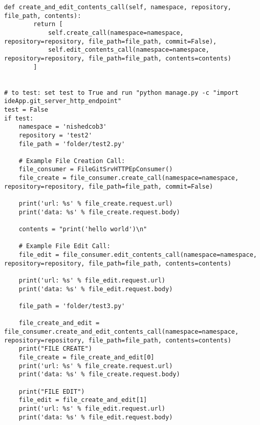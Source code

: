 \begin{lstlisting}[breaklines]
    def create_and_edit_contents_call(self, namespace, repository, file_path, contents):
        return [
            self.create_call(namespace=namespace, repository=repository, file_path=file_path, commit=False),
            self.edit_contents_call(namespace=namespace, repository=repository, file_path=file_path, contents=contents)
        ]


# to test: set test to True and run "python manage.py -c "import ideApp.git_server_http_endpoint"
test = False
if test:
    namespace = 'nishedcob3'
    repository = 'test2'
    file_path = 'folder/test2.py'

    # Example File Creation Call:
    file_consumer = FileGitSrvHTTPEpConsumer()
    file_create = file_consumer.create_call(namespace=namespace, repository=repository, file_path=file_path, commit=False)

    print('url: %s' % file_create.request.url)
    print('data: %s' % file_create.request.body)

    contents = "print('hello world')\n"

    # Example File Edit Call:
    file_edit = file_consumer.edit_contents_call(namespace=namespace, repository=repository, file_path=file_path, contents=contents)

    print('url: %s' % file_edit.request.url)
    print('data: %s' % file_edit.request.body)

    file_path = 'folder/test3.py'

    file_create_and_edit = file_consumer.create_and_edit_contents_call(namespace=namespace, repository=repository, file_path=file_path, contents=contents)
    print("FILE CREATE")
    file_create = file_create_and_edit[0]
    print('url: %s' % file_create.request.url)
    print('data: %s' % file_create.request.body)

    print("FILE EDIT")
    file_edit = file_create_and_edit[1]
    print('url: %s' % file_edit.request.url)
    print('data: %s' % file_edit.request.body)
\end{lstlisting}
\lstset{language=Bash}
